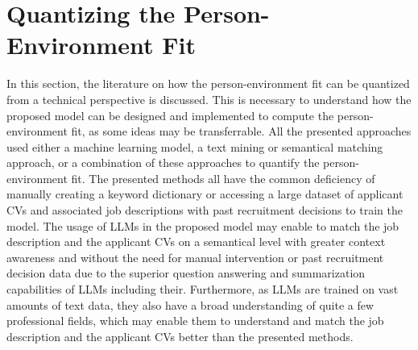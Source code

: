 \documentclass[draft,final]{thesisclass} %
\begin{document}
\section{Quantizing the Person-Environment Fit}
In this section, the literature on how the person-environment fit can be quantized from a technical perspective is discussed.
This is necessary to understand how the proposed model can be designed and implemented to compute the person-environment fit, as some ideas may be transferrable.
All the presented approaches used either a machine learning model, a text mining or semantical matching approach, or a combination of these approaches to quantify the person-environment fit.
The presented methods all have the common deficiency of manually creating a keyword dictionary or accessing a large dataset of applicant \acs{CV}s and associated job descriptions with past recruitment decisions to train the model.
The usage of \acs{LLM}s in the proposed model may enable to match the job description and the applicant \acs{CV}s on a semantical level with greater context awareness and without the need for manual intervention or past recruitment decision data due to the superior question answering and summarization capabilities of \acs{LLM}s including their.
Furthermore, as \acs{LLM}s are trained on vast amounts of text data, they also have a broad understanding of quite a few professional fields, which may enable them to understand and match the job description and the applicant \acs{CV}s better than the presented methods.
\end{document}
